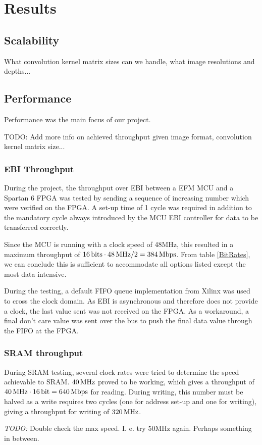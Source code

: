 \section{Results}


\subsection{Scalability}
What convolution kernel matrix sizes can we handle, what image resolutions and depths...

\subsection{Performance}
Performance was the main focus of our project.

TODO: Add more info on achieved throughput given image format, convolution kernel matrix size...

\subsubsection{EBI Throughput} \label{subsec:EbiThroughput}
During the project, the throughput over EBI between a EFM MCU and a Spartan 6 FPGA was tested by sending a sequence of increasing number which were verified on the FPGA.
A set-up time of 1 cycle was required in addition to the mandatory cycle always introduced by the MCU EBI controller for data to be transferred correctly.

Since the MCU is running with a clock speed of 48MHz, this resulted in a maximum throughput of $\unit[16]{bits} \cdot \unit[48]{MHz} / 2 = \unit[384]{Mbps}$.
From table \ref{BitRates}, we can conclude this is sufficient to accommodate all options listed except the most data intensive.

During the testing, a default FIFO queue implementation from Xilinx was used to cross the clock domain.
As EBI is asynchronous and therefore does not provide a clock, the last value sent was not received on the FPGA.
As a workaround, a final don't care value was sent over the bus to push the final data value through the FIFO at the FPGA.

\subsubsection{SRAM throughput} \label{subsec:SramThroughput}
During SRAM testing, several clock rates were tried to determine the speed achievable to SRAM.
$\unit[40]{MHz}$ proved to be working, which gives a throughput of $\unit[40]{MHz}\cdot\unit[16]{bit} = \unit[640]{Mbps}$ for reading.
During writing, this number must be halved as a write requires two cycles (one for address set-up and one for writing), giving a throughput for writing of $\unit[320]{MHz}$.

\emph{TODO:} Double check the max speed. I. e. try 50MHz again. Perhaps something in between.
